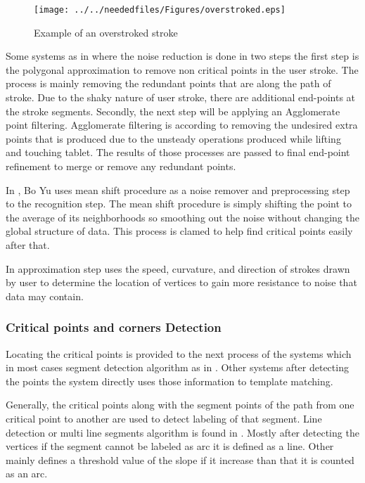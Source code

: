 \begin{figure}
	\centering
		\texttt{[image: ../../neededfiles/Figures/overstroked.eps]}
	\caption{Example of an overstroked stroke}
	\label{fig:overstroked}
\end{figure} 
Some systems as in \cite{SmartSketch56} where the noise reduction is done in two steps the first step is the polygonal approximation to remove non critical points in the user stroke. The process is mainly removing the redundant points that are along the path of stroke. Due to the shaky nature of user stroke, there are additional end-points at the stroke segments. Secondly, the next step will be applying an Agglomerate point filtering.  Agglomerate filtering is according to \cite {statesurvey35} removing the undesired extra points that is produced due to the unsteady operations produced while lifting and touching tablet.  The results of those processes are passed to final end-point refinement to merge or remove any redundant points.

In \cite{meanshift10,domainindependent17}, Bo Yu uses mean shift procedure as a noise remover and preprocessing step to the recognition step. The mean shift procedure is simply shifting the point to the average of its neighborhoods so smoothing out the noise without changing the global structure of data.  This process is clamed to help find critical points easily after that.

In \cite {domainindependent17}    approximation step uses the speed, curvature, and direction of strokes drawn by user to determine the location of vertices to gain more resistance to noise that data may contain. 


\subsubsection{Critical points and corners Detection}
\label{sec:CriticalPointsAndCornersDetection}

Locating the critical points is provided to the next process of the systems which in most cases segment detection algorithm as in \cite{Simusketch51} . Other systems after detecting the points the system directly uses those information to template matching.

Generally, the critical points along with the segment points of the path from one critical point to another are used to detect labeling of that segment. 
Line detection or multi line segments algorithm is found in \cite{polygonfeedback31} . Mostly after detecting the vertices if the segment cannot be labeled as arc it is defined as a line. Other mainly defines a threshold value of the slope if it increase than that it is counted as an arc.

